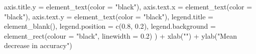 \documentclass[
  11pt,
  oneside]{book}
\newenvironment{Shaded}{\begin{snugshade}}{\end{snugshade}}
\newcommand{\AttributeTok}[1]{\textcolor[rgb]{0.77,0.63,0.00}{#1}}
\newcommand{\FloatTok}[1]{\textcolor[rgb]{0.00,0.00,0.81}{#1}}
\newcommand{\FunctionTok}[1]{\textcolor[rgb]{0.00,0.00,0.00}{#1}}
\newcommand{\NormalTok}[1]{#1}
\newcommand{\SpecialCharTok}[1]{\textcolor[rgb]{0.00,0.00,0.00}{#1}}
\newcommand{\StringTok}[1]{\textcolor[rgb]{0.31,0.60,0.02}{#1}}
\begin{document}
\begin{Shaded}
\begin{Highlighting}[]
    \AttributeTok{axis.title.y =} \FunctionTok{element\_text}\NormalTok{(}\AttributeTok{color =} \StringTok{"black"}\NormalTok{),}
    \AttributeTok{axis.text.x =} \FunctionTok{element\_text}\NormalTok{(}\AttributeTok{color =} \StringTok{"black"}\NormalTok{),}
    \AttributeTok{axis.text.y =} \FunctionTok{element\_text}\NormalTok{(}\AttributeTok{color =} \StringTok{"black"}\NormalTok{),}
    \AttributeTok{legend.title =} \FunctionTok{element\_blank}\NormalTok{(),}
    \AttributeTok{legend.position =} \FunctionTok{c}\NormalTok{(}\FloatTok{0.8}\NormalTok{, }\FloatTok{0.2}\NormalTok{),}
    \AttributeTok{legend.background =} \FunctionTok{element\_rect}\NormalTok{(}\AttributeTok{colour =} \StringTok{"black"}\NormalTok{, }\AttributeTok{linewidth =} \FloatTok{0.2}\NormalTok{)}
\NormalTok{  ) }\SpecialCharTok{+}
  \FunctionTok{xlab}\NormalTok{(}\StringTok{""}\NormalTok{) }\SpecialCharTok{+}
  \FunctionTok{ylab}\NormalTok{(}\StringTok{"Mean decrease in accuracy"}\NormalTok{)}
\end{Highlighting}
\end{Shaded}
\end{document}

